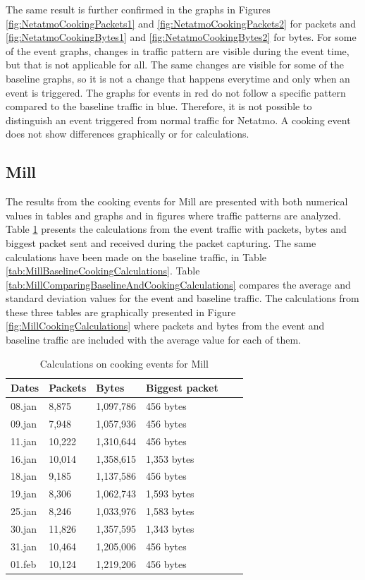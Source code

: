The same result is further confirmed in the graphs in Figures \ref{fig:NetatmoCookingPackets1} and \ref{fig:NetatmoCookingPackets2} for packets and \ref{fig:NetatmoCookingBytes1} and \ref{fig:NetatmoCookingBytes2} for bytes. For some of the event graphs, changes in traffic pattern are visible during the event time, but that is not applicable for all. The same changes are visible for some of the baseline graphs, so it is not a change that happens everytime and only when an event is triggered. The graphs for events in red do not follow a specific pattern compared to the baseline traffic in blue. Therefore, it is not possible to distinguish an event triggered from normal traffic for Netatmo. A cooking event does not show differences graphically or for calculations. 

\newpage
\subsection{Mill}
The results from the cooking events for Mill are presented with both numerical values in tables and graphs and in figures where traffic patterns are analyzed. Table \ref{tab:MillCookingCalculations} presents the calculations from the event traffic with packets, bytes and biggest packet sent and received during the packet capturing. The same calculations have been made on the baseline traffic, in Table \ref{tab:MillBaselineCookingCalculations}. Table \ref{tab:MillComparingBaselineAndCookingCalculations} compares the average and standard deviation values for the event and baseline traffic. The calculations from these three tables are graphically presented in Figure \ref{fig:MillCookingCalculations} where packets and bytes from the event and baseline traffic are included with the average value for each of them. 

\begin{table}[H]
    \centering
    \caption{Calculations on cooking events for Mill}
    \begin{tabular}{|l|l|l|l|l|l|}
    \hline
        \textbf{Dates} & \textbf{Packets} & \textbf{Bytes} & \textbf{Biggest packet} \\ \hline
        08.jan & 8,875  & 1,097,786 & 456 bytes   \\ \hline
        09.jan & 7,948  & 1,057,936 & 456 bytes   \\ \hline
        11.jan & 10,222 & 1,310,644 & 456 bytes   \\ \hline
        16.jan & 10,014 & 1,358,615 & 1,353 bytes \\ \hline
        18.jan & 9,185  & 1,137,586 & 456 bytes   \\ \hline
        19.jan & 8,306  & 1,062,743 & 1,593 bytes \\ \hline
        25.jan & 8,246  & 1,033,976 & 1,583 bytes \\ \hline
        30.jan & 11,826 & 1,357,595 & 1,343 bytes  \\ \hline
        31.jan & 10,464 & 1,205,006 & 456 bytes \\ \hline
        01.feb & 10,124 & 1,219,206 & 456 bytes \\ \hline
    \end{tabular}
    \label{tab:MillCookingCalculations}
\end{table}

